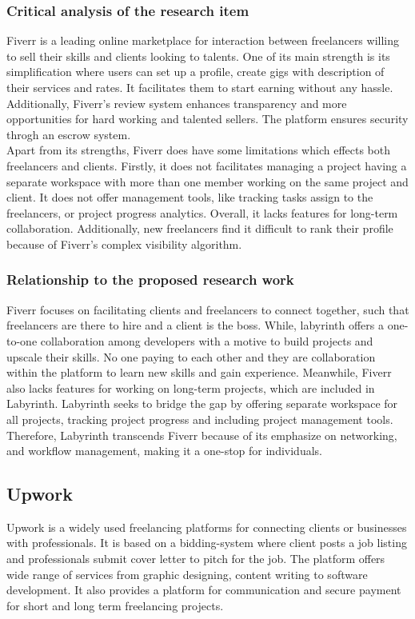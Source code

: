 \documentclass{FastFyp}
\begin{document}
\subsubsection{Critical analysis of the research item}
Fiverr is a leading online marketplace for interaction between freelancers willing to sell their skills and clients looking to talents. One of its main strength is its simplification where users can set up a profile, create gigs with description of their services and rates. It facilitates them to start earning without any hassle. Additionally, Fiverr's review system enhances transparency and more opportunities for hard working and talented sellers. The platform ensures security throgh an escrow system. \\
Apart from its strengths, Fiverr does have some limitations which effects both freelancers and clients. Firstly, it does not facilitates managing a project having a separate workspace with more than one member working on the same project and client. It does not offer management tools, like tracking tasks assign to the freelancers, or project progress analytics. Overall, it lacks features for long-term collaboration. Additionally, new freelancers find it difficult to rank their profile because of Fiverr's complex visibility algorithm. 
\subsubsection{Relationship to the proposed research work}
Fiverr focuses on facilitating clients and freelancers to connect together, such that freelancers are there to hire and a client is the boss. While, labyrinth offers a one-to-one collaboration among developers with a motive to build projects and upscale their skills. No one paying to each other and they are collaboration within the platform to learn new skills and gain experience. Meanwhile, Fiverr also lacks features for working on long-term projects, which are included in Labyrinth. Labyrinth seeks to bridge the gap by offering separate workspace for all projects, tracking project progress and including project management tools. Therefore, Labyrinth transcends Fiverr because of its emphasize on networking, and workflow management, making it a one-stop for individuals.
\subsection{Upwork}
Upwork is a widely used freelancing platforms for connecting clients or businesses with professionals. It is based on a bidding-system where client posts a job listing and professionals submit cover letter to pitch for  the job. The platform offers wide range of services from graphic designing, content writing to software development. It also provides a platform for communication and secure payment for short and long term freelancing projects.
\end{document}
